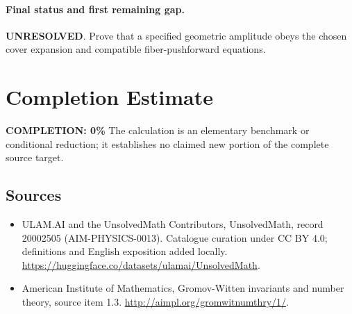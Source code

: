 \documentclass[11pt]{article}
\begin{document}
\paragraph{Final status and first remaining gap.}
\textbf{UNRESOLVED}. Prove that a specified geometric amplitude obeys the chosen cover expansion and compatible fiber-pushforward equations.

\section{Completion Estimate}
\noindent\textbf{COMPLETION: 0\%}
The calculation is an elementary benchmark or conditional reduction; it establishes no claimed new portion of the complete source target.

\subsection{Sources}
\begin{itemize}
\item[\hypertarget{source:20002505:1}{S1}] ULAM.AI and the UnsolvedMath Contributors, UnsolvedMath, record 20002505 (AIM-PHYSICS-0013). Catalogue curation under CC BY 4.0; definitions and English exposition added locally.
\url{https://huggingface.co/datasets/ulamai/UnsolvedMath}.
\item[\hypertarget{source:20002505:2}{S2}] American Institute of Mathematics, Gromov-Witten invariants and number theory, source item 1.3.
\url{http://aimpl.org/gromwitnumthry/1/}.
\end{itemize}
\label{end:20002505}
\end{document}
